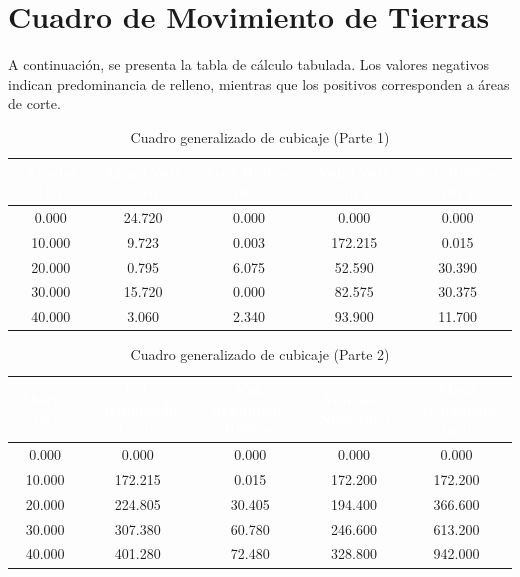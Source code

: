 \documentclass[11pt,letterpaper]{article}
\begin{document}
\section{Cuadro de Movimiento de Tierras}
A continuación, se presenta la tabla de cálculo tabulada. Los valores negativos indican predominancia de relleno, mientras que los positivos corresponden a áreas de corte.
\begin{table}[H]
  \centering
  \small
  \caption{Cuadro generalizado de cubicaje (Parte 1)}
  \label{tab:cubicaje_0}
  \begin{tabular}{|c|c|c|c|c|}
    \hline
    \rowcolor{GeoBlue}
    \textcolor{white}{\textbf{Abscisa (K)}} & \textcolor{white}{\textbf{Área Corte (m²)}} & \textcolor{white}{\textbf{Área Relleno (m²)}} & \textcolor{white}{\textbf{Vol. Corte (m³)}} & \textcolor{white}{\textbf{Vol. Relleno (m³)}} \\
    \hline
    \rowcolor{GeoBlue!5}
    0.000 & 24.720 & 0.000 & 0.000 & 0.000 \\
    \hline
    \rowcolor{white}
    10.000 & 9.723 & 0.003 & 172.215 & 0.015 \\
    \hline
    \rowcolor{GeoBlue!5}
    20.000 & 0.795 & 6.075 & 52.590 & 30.390 \\
    \hline
    \rowcolor{white}
    30.000 & 15.720 & 0.000 & 82.575 & 30.375 \\
    \hline
    \rowcolor{GeoBlue!5}
    40.000 & 3.060 & 2.340 & 93.900 & 11.700 \\
    \hline
  \end{tabular}
\end{table}
\vspace{0.8cm}
\begin{table}[H]
  \centering
  \small
  \caption{Cuadro generalizado de cubicaje (Parte 2)}
  \label{tab:cubicaje_1}
  \begin{tabular}{|c|c|c|c|c|}
    \hline
    \rowcolor{GeoBlue}
    \textcolor{white}{\textbf{Abscisa (K)}} & \textcolor{white}{\textbf{Vol. Acumulado Corte}} & \textcolor{white}{\textbf{Vol. Acumulado Relleno}} & \textcolor{white}{\textbf{Volumen Neto (m³)}} & \textcolor{white}{\textbf{Masa Acumulada (m³)}} \\
    \hline
    \rowcolor{GeoBlue!5}
    0.000 & 0.000 & 0.000 & 0.000 & 0.000 \\
    \hline
    \rowcolor{white}
    10.000 & 172.215 & 0.015 & 172.200 & 172.200 \\
    \hline
    \rowcolor{GeoBlue!5}
    20.000 & 224.805 & 30.405 & 194.400 & 366.600 \\
    \hline
    \rowcolor{white}
    30.000 & 307.380 & 60.780 & 246.600 & 613.200 \\
    \hline
    \rowcolor{GeoBlue!5}
    40.000 & 401.280 & 72.480 & 328.800 & 942.000 \\
    \hline
  \end{tabular}
\end{table}
\vspace{0.8cm}
\end{document}
